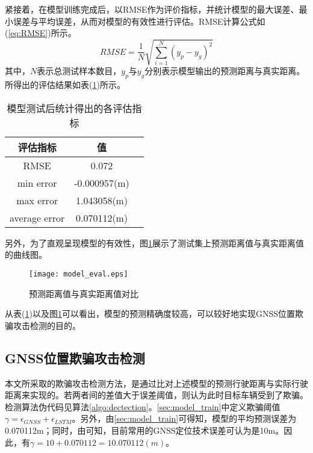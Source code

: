 紧接着，在模型训练完成后，以RMSE作为评价指标，并统计模型的最大误差、最小误差与平均误差，从而对模型的有效性进行评估。RMSE计算公式如(\ref{eq:RMSE})所示。
\begin{equation}
    RMSE=\frac{1}{N}\sqrt{\sum_{i=1}^N(y_p-y_g)^2}
    \label{eq:RMSE}
\end{equation}
其中，$N$表示总测试样本数目，$y_p$与$y_g$分别表示模型输出的预测距离与真实距离。所得出的评估结果如表(\ref{tab:metrics})所示。

\begin{table}
    \begin{center}
    \begin{tabular}{ccl}
        \toprule
        评估指标 & 值 \\
        \midrule
        RMSE & 0.072 \\
        min error & -0.000957(m) \\
        max error & 1.043058(m) \\
        average error & 0.070112(m) \\
        \bottomrule
    \end{tabular}
    \end{center}
    \caption{模型测试后统计得出的各评估指标}
    \label{tab:metrics}
\end{table}

另外，为了直观呈现模型的有效性，图\ref{fig:model_eval}展示了测试集上预测距离值与真实距离值的曲线图。
\begin{figure}[htbp]
    \begin{center}
        \texttt{[image: model\_eval.eps]}
    \end{center}
    \caption{预测距离值与真实距离值对比}
    \label{fig:model_eval}
\end{figure}
从表(\ref{tab:metrics})以及图\ref{fig:model_eval}可以看出，模型的预测精确度较高，可以较好地实现GNSS位置欺骗攻击检测的目的。

\subsection{GNSS位置欺骗攻击检测}
本文所采取的欺骗攻击检测方法，是通过比对上述模型的预测行驶距离与实际行驶距离来实现的。若两者间的差值大于误差阈值，则认为此时目标车辆受到了欺骗。检测算法伪代码见算法\ref{algo:dectection}。\ref{sec:model_train}中定义欺骗阈值$\gamma=\epsilon_{GNSS}+\epsilon_{LSTM}$。另外，由\ref{sec:model_train}可得知，模型的平均预测误差为0.070112m；同时，由\cite{kaplan2005understanding}可知，目前常用的GNSS定位技术误差可认为是10m。因此，有$\gamma=10+0.070112=10.070112(m)$。


